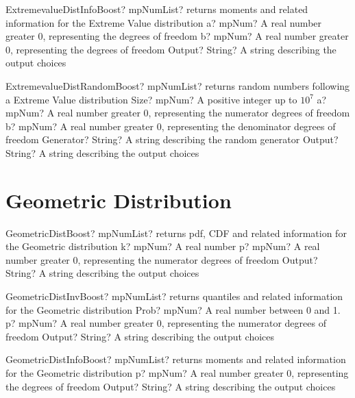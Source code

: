 \documentclass[12pt,a4paper,openany]{book}
\begin{document}
\begin{mpFunctionsExtract}
\mpFunctionThree
{ExtremevalueDistInfoBoost? mpNumList? returns moments and related information for the Extreme Value distribution}
{a? mpNum? A real number greater 0, representing the degrees of freedom}
{b? mpNum? A real number greater 0, representing the degrees of freedom}
{Output? String? A string describing the output choices}
\end{mpFunctionsExtract}

\begin{mpFunctionsExtract}
\mpFunctionFive
{ExtremevalueDistRandomBoost? mpNumList? returns random numbers following a Extreme Value distribution}
{Size? mpNum? A positive integer up to $10^7$}
{a? mpNum? A real number greater 0, representing the numerator  degrees of freedom}
{b? mpNum? A real number greater 0, representing the denominator degrees of freedom}
{Generator? String? A string describing the random generator}
{Output? String? A string describing the output choices}
\end{mpFunctionsExtract}

\section{Geometric Distribution}

\begin{mpFunctionsExtract}
\mpFunctionThree
{GeometricDistBoost? mpNumList? returns pdf, CDF and related information for the Geometric distribution}
{k? mpNum? A real number}
{p? mpNum? A real number greater 0, representing the numerator  degrees of freedom}
{Output? String? A string describing the output choices}
\end{mpFunctionsExtract}

\begin{mpFunctionsExtract}
\mpFunctionThree
{GeometricDistInvBoost? mpNumList? returns quantiles and related information for the Geometric distribution}
{Prob? mpNum? A real number between 0 and 1.}
{p? mpNum? A real number greater 0, representing the numerator  degrees of freedom}
{Output? String? A string describing the output choices}
\end{mpFunctionsExtract}

\begin{mpFunctionsExtract}
\mpFunctionTwo
{GeometricDistInfoBoost? mpNumList? returns moments and related information for the Geometric distribution}
{p? mpNum? A real number greater 0, representing the degrees of freedom}
{Output? String? A string describing the output choices}
\end{mpFunctionsExtract}
\end{document}
